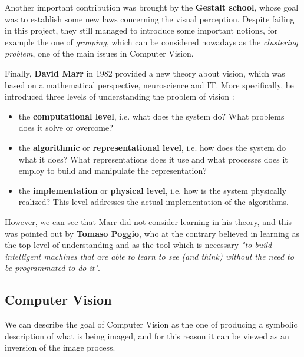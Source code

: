 Another important contribution was brought by the \textbf{Gestalt school}, whose goal was to establish some new laws concerning the visual perception. Despite failing in this project, they still managed to introduce some important notions, for example the one of \textit{grouping}, which can be considered nowadays as the \textit{clustering problem}, one of the main issues in Computer Vision.

Finally, \textbf{David Marr} in 1982 provided a new theory about vision, which was based on a mathematical perspective, neuroscience and IT. More specifically, he introduced three levels of understanding the problem of vision :

\begin{itemize}
    \item the \textbf{computational level}, i.e. what does the system do? What problems does it solve or overcome?
    \item the \textbf{algorithmic} or \textbf{representational level}, i.e. how does the system do what it does? What representations does it use and what processes does it employ to build and manipulate the representation? 
    \item the \textbf{implementation} or \textbf{physical level}, i.e. how is the system physically realized? This level addresses the actual implementation of the algorithms.
\end{itemize}

However, we can see that Marr did not consider learning in his theory, and this was pointed out by \textbf{Tomaso Poggio}, who at the contrary believed in learning as the top level of understanding and as the tool which is necessary \textit{"to build intelligent machines that are able to learn to see (and think) without the need to be programmated to do it"}.

\subsection{Computer Vision}
We can describe the goal of Computer Vision as the one of producing a symbolic description of what is being imaged, and for this reason it can be viewed as an inversion of the image process.

